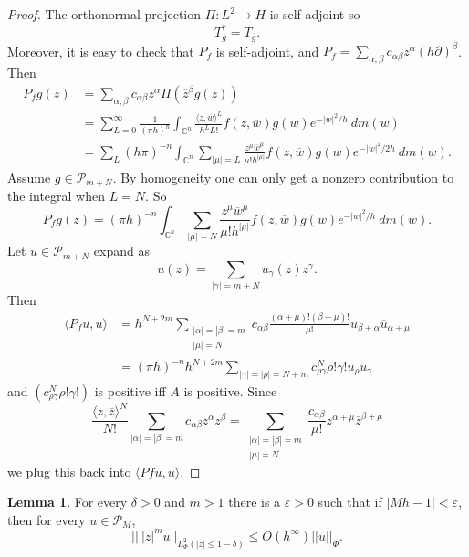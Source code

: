 \documentclass[12pt]{report}
\newcommand{\CC}{\mathbb{C}}
\theoremstyle{definition}
\newtheorem{lemma}[theorem]{Lemma}
\begin{document}
\begin{proof}
    The orthonormal projection $\Pi: L^2 \to H$ is self-adjoint so
    $$T_g^* = T_{\overline g}.$$
    Moreover, it is easy to check that $P_f$ is self-adjoint, and $P_f = \sum_{\alpha,\beta} c_{\alpha\beta} z^\alpha (h\partial)^\beta$. Then
\begin{align*}P_fg(z) &= \sum_{\alpha,\beta} c_{\alpha\beta} z^\alpha \Pi(\overline z^\beta g(z)) \\
&= \sum_{L=0}^\infty \frac{1}{(\pi h)^n} \int_{\CC^n} \frac{\langle z, \overline w\rangle^L}{h^LL!} f(z, \overline w) g(w) e^{-|w|^2/h} ~dm(w)\\
&= \sum_L (h\pi)^{-n} \int_{\CC^n} \sum_{|\mu| = L} \frac{z^\mu \overline w^\mu}{\mu! h^{|\mu|}} f(z, \overline w) g(w) e^{-|w|^2/2h} ~dm(w).
\end{align*}
Assume $g \in \mathcal P_{m + N}$. By homogeneity one can only get a nonzero contribution to the integral when $L = N$. So
$$P_fg(z) = (\pi h)^{-n} \int_{\CC^n} \sum_{|\mu| = N} \frac{z^\mu \overline w^\mu}{\mu! h^{|\mu|}} f(z, \overline w) g(w) e^{-|w|^2/h} ~dm(w).$$
Let $u \in \mathcal P_{m + N}$ expand as
$$u(z) = \sum_{|\gamma| = m + N} u_\gamma(z) z^\gamma.$$
Then
\begin{align*}\langle P_fu, u\rangle &=
h^{N + 2m}\sum_{\substack{|\alpha| = |\beta| = m\\|\mu| = N}} c_{\alpha\beta} \frac{(\alpha + \mu)!(\beta + \mu)!}{\mu!}u_{\beta + \alpha} \overline u_{\alpha + \mu}\\
&= (\pi h)^{-n} h^{N+2m} \sum_{|\gamma| = |\rho| = N + m} c^N_{\rho\gamma} \rho! \gamma! u_\rho \overline u_\gamma
\end{align*}
and $(c^N_{\rho\gamma}\rho!\gamma!)$ is positive iff $A$ is positive. Since
$$\frac{\langle z, \overline z\rangle^N}{N!} \sum_{|\alpha|=|\beta|=m} c_{\alpha\beta}z^\alpha z^\beta = \sum_{\substack{|\alpha| = |\beta| =m\\|\mu| = N}} \frac{c_{\alpha\beta}}{\mu!} z^{\alpha + \mu} \overline z^{\beta + \mu}$$
we plug this back into $\langle Pf u, u\rangle$.
\end{proof}
\begin{lemma}
    For every $\delta > 0$ and $m > 1$ there is a $\varepsilon > 0$ such that if $|Mh - 1| < \varepsilon$, then for every $u \in \mathcal P_M$,
    $$||~|z|^mu||_{L^2_\Phi(|z| \leq 1 - \delta)} \leq O(h^\infty)||u||_\Phi.$$
\end{lemma}
\end{document}
